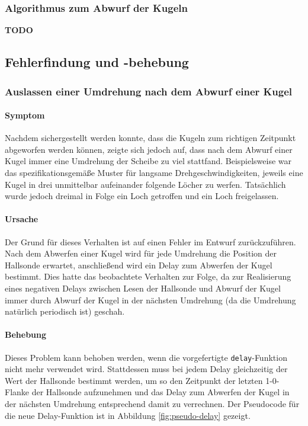 \documentclass{kis}
\newcommand{\todo}{\textbf{TODO}}
\begin{document}
\subsubsection{Algorithmus zum Abwurf der Kugeln}
\todo

\subsection{Fehlerfindung und -behebung}

\subsubsection{Auslassen einer Umdrehung nach dem Abwurf einer Kugel}
\paragraph{Symptom}
Nachdem sichergestellt werden konnte, dass die Kugeln zum richtigen Zeitpunkt abgeworfen werden können, zeigte sich jedoch auf, dass nach dem Abwurf einer Kugel immer eine Umdrehung der Scheibe zu viel stattfand. Beispielsweise war das spezifikationsgemäße Muster für langsame Drehgeschwindigkeiten, jeweils eine Kugel in drei unmittelbar aufeinander folgende Löcher zu werfen. Tatsächlich wurde jedoch dreimal in Folge ein Loch getroffen und ein Loch freigelassen.

\paragraph{Ursache}
Der Grund für dieses Verhalten ist auf einen Fehler im Entwurf zurückzuführen. Nach dem Abwerfen einer Kugel wird für jede Umdrehung die Position der Hallsonde erwartet, anschließend wird ein Delay zum Abwerfen der Kugel bestimmt. Dies hatte das beobachtete Verhalten zur Folge, da zur Realisierung eines \glqq negativen Delays\grqq{} zwischen Lesen der Hallsonde und Abwurf der Kugel immer durch Abwurf der Kugel in der nächsten Umdrehung (da die Umdrehung natürlich periodisch ist) geschah. 

\paragraph{Behebung}
Dieses Problem kann behoben werden, wenn die vorgefertigte \texttt{delay}-Funktion nicht mehr verwendet wird. Stattdessen muss bei jedem Delay gleichzeitig der Wert der Hallsonde bestimmt werden, um so den Zeitpunkt der letzten 1-0-Flanke der Hallsonde aufzunehmen und das Delay zum Abwerfen der Kugel in der nächsten Umdrehung entsprechend damit zu verrechnen. Der Pseudocode für die neue Delay-Funktion ist in Abbildung \ref{fig:pseudo-delay} gezeigt.
\end{document}
